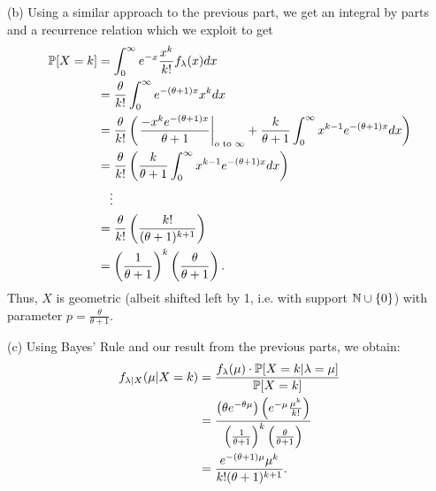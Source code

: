 (b) Using a similar approach to the previous part, we get an integral by parts and a recurrence relation which we exploit to get
\begin{align*}
    \P[X = k] &= \int_0^\infty e^{-x}\frac{x^k}{k!}f_\lambda(x) dx \\
    &= \frac{\theta}{k!}\int_0^\infty e^{-(\theta + 1)x}x^k dx \\
    &= \frac{\theta}{k!}\left(\left.\frac{-x^k e^{-(\theta + 1)x}}{\theta + 1}\right|_{o \f{ to } \infty} + \frac{k}{\theta + 1}\int_0^\infty x^{k-1}e^{-(\theta + 1)x} dx \right) \\
    &= \frac{\theta}{k!}\left(\frac{k}{\theta + 1}\int_0^\infty x^{k-1}e^{-(\theta + 1)x} dx \right) \\
    &\quad\vdots \\
    &= \frac{\theta}{k!}\left(\frac{k!}{(\theta + 1)^{k+1}}\right) \\
    &= \left(\frac{1}{\theta + 1}\right)^k\left(\frac{\theta}{\theta + 1}\right).
\end{align*}
Thus, $X$ is geometric (albeit shifted left by 1, i.e. with support $\N \cup \{0\}$) with parameter $p = \frac{\theta}{\theta + 1}$.

(c) Using Bayes' Rule and our result from the previous parts, we obtain:
\begin{align*}
    f_{\lambda|X}(\mu | X = k) &= \frac{f_\lambda(\mu) \cdot \P[X = k | \lambda = \mu]}{\P[X = k]} \\
    &= \frac{\left(\theta e^{-\theta\mu}\right)\left(e^{-\mu}\frac{\mu^k}{k!}\right)}{\left(\frac{1}{\theta + 1}\right)^k\left(\frac{\theta}{\theta + 1}\right)} \\
    &= \frac{e^{-(\theta + 1)\mu}\mu^k}{k!(\theta + 1)^{k+1}}.
\end{align*}

